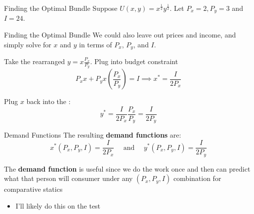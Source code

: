 \documentclass[12pt,t]{beamer}
\begin{document}
\begin{frame}{Finding the Optimal Bundle}
  Suppose $U(x,y) = x^{\frac{1}{2}}y^{\frac{1}{2}}$. Let $P_x = 2, P_y=3$ and $I = 24$.


\end{frame}

\begin{frame}{Finding the Optimal Bundle}
  We could also leave out prices and income, and simply solve for $x$ and $y$ in terms of $P_x$, $P_y$, and $I$.
  
  \bigskip
  Take the rearranged  $y = x\frac{P_x}{P_y}$. Plug into budget constraint
  $$
    P_x x + P_y x (\frac{P_x}{P_y}) = I \implies x^* = \frac{I}{2P_x}
  $$ 
  
  \bigskip
  Plug $x$ back into the :
  $$
    y^* = \frac{I}{2P_x}\frac{P_x}{P_y} = \frac{I}{2P_y}
  $$
\end{frame}

\begin{frame}{Demand Functions}
  The resulting \textbf{demand functions} are:
  $$
    x^*(P_x, P_y, I) =  \frac{I}{2P_x} 
    \quad\text{ and }\quad
    y^*(P_x, P_y, I) = \frac{I}{2P_y}
  $$

  \pause\bigskip
  The \textbf{demand function} is useful since we do the work once and then can predict what that person will consumer under any $(P_x, P_y, I)$ combination for comparative statics
  \begin{itemize}
    \item I'll likely do this on the test
  \end{itemize}
\end{frame}
\end{document}
